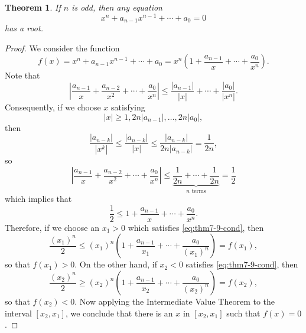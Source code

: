 \documentclass{article}
\numberwithin{corollary}{subsection}
\numberwithin{definition}{subsection}
\numberwithin{lemma}{subsection}
\newtheorem{theorem}{Theorem}
\numberwithin{theorem}{subsection}
\begin{document}
\begin{theorem}
  If $n$ is odd, then any equation \[
    x^n + a_{n-1}x^{n-1} + \cdots + a_0 = 0
  \] has a root.
\end{theorem}
\begin{proof}
  We consider the function \[
    f(x) = x^n + a_{n-1}x^{n-1} + \cdots + a_0
    = x^n \left(1 + \frac{a_{n-1}}{x} + \cdots + \frac{a_0}{x^n}\right).
  \] Note that \[
    \left|\frac{a_{n-1}}{x} + \frac{a_{n-2}}{x^2} + \cdots +
    \frac{a_0}{x^n}\right|
    \leq \frac{|a_{n-1}|}{|x|} + \cdots + \frac{|a_0|}{|x^n|}.
  \] Consequently, if we choose $x$ satisfying \[
    \label{eq:thm7-9-cond} \tag{*}
    |x| \geq 1, 2n|a_{n-1}|, \ldots, 2n|a_0|,
  \] then \[
    \frac{|a_{n-k}|}{|x^k|}
    \leq \frac{|a_{n-k}|}{|x|}
    \leq \frac{|a_{n-k}|}{2n |a_{n-k}|}
    = \frac{1}{2n},
  \] so \[
    \left|\frac{a_{n-1}}{x} + \frac{a_{n-2}}{x^2} + \cdots +
    \frac{a_0}{x^n}\right|
    \leq \underbrace{\frac{1}{2n} + \cdots + \frac{1}{2n}}_\text{$n$ terms}
    = \frac{1}{2}
  \] which implies that \[
    \frac{1}{2} \leq 1 + \frac{a_{n-1}}{x} + \cdots + \frac{a_0}{x^n}.
  \] Therefore, if we choose an $x_1 > 0$ which satisfies
  \eqref{eq:thm7-9-cond}, then \[
    \frac{(x_1)^n}{2}
    \leq (x_1)^n\left(1 + \frac{a_{n-1}}{x_1} + \cdots +
    \frac{a_0}{(x_1)^n}\right)
    = f(x_1),
  \] so that $f(x_1) > 0$. On the other hand, if $x_2 < 0$ satisfies
  \eqref{eq:thm7-9-cond}, then \[
    \frac{(x_2)^n}{2}
    \geq (x_2)^n\left(1 + \frac{a_{n-1}}{x_2} + \cdots +
    \frac{a_0}{(x_2)^n}\right)
    = f(x_2),
  \] so that $f(x_2) < 0$. Now applying the Intermediate Value Theorem to the
  interval $[x_2, x_1]$, we conclude that there is an $x$ in $[x_2, x_1]$ such
  that $f(x) = 0$.
\end{proof}
\end{document}
